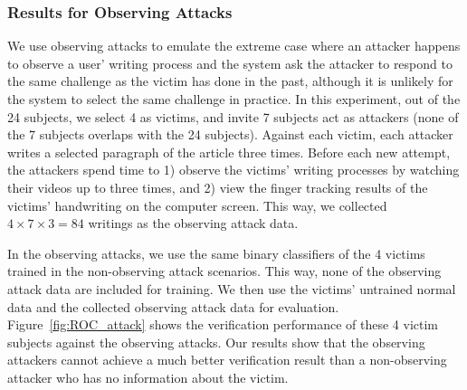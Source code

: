 %

\subsubsection{Results for Observing Attacks}


We use observing attacks to emulate the extreme case where an attacker happens to observe a user' writing process and the system ask the attacker to respond to the same challenge as the victim has done in the past, although it is unlikely for the system to select the same challenge in practice.  In this experiment, out of the 24 subjects, we  select 4 as victims, and invite 7 subjects act as attackers (none of the 7 subjects overlaps with the 24 subjects). Against each victim, each attacker writes a selected paragraph of the article three times. Before each new attempt, the attackers spend time to 1) observe the victims' writing processes by watching their videos up to three times, 
and 2) view the finger tracking results of the victims' handwriting on the computer screen. This way, we collected $4\times 7 \times 3=84$ writings as the observing attack data. 

In the observing attacks, we use the same binary classifiers of the 4 victims trained in the non-observing attack scenarios. This way, none of the observing attack data are included for training. We then use the victims' untrained normal data and the collected observing attack data for evaluation. Figure~\ref{fig:ROC_attack} shows the verification performance of these 4 victim subjects against the observing attacks. Our results show that the observing attackers cannot achieve a much better verification result than a non-observing attacker who has no information about the victim.  




